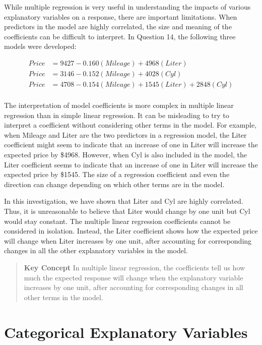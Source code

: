 \documentclass[
]{report}
\begin{document}
While multiple regression is very useful in understanding the impacts of various explanatory variables on a response, there are important limitations. When predictors in the model are highly correlated, the size and meaning of the coefficients can be difficult to interpret. In Question 14, the following three models were developed:

\begin{align}
 Price &= 9427 - 0.160(Mileage) + 4968(Liter)\\
 Price &= 3146 - 0.152(Mileage) + 4028(Cyl)\\
 Price &= 4708 - 0.154(Mileage) + 1545(Liter) + 2848(Cyl)\\
 \end{align}

The interpretation of model coefficients is more complex in multiple linear regression than in simple linear regression. It can be misleading to try to interpret a coefficient without considering other terms in the model. For example, when Mileage and Liter are the two predictors in a regression model, the Liter coefficient might seem to indicate that an increase of one in Liter will increase the expected price by \$4968. However, when Cyl is also included in the model, the Liter coefficient seems to indicate that an increase of one in Liter will increase the expected price by \$1545. The size of a regression coefficient and even the direction can change depending on which other terms are in the model.

In this investigation, we have shown that Liter and Cyl are highly correlated. Thus, it is unreasonable to believe that Liter would change by one unit but Cyl would stay constant. The multiple linear regression coefficients cannot be considered in isolation. Instead, the Liter coefficient shows how the expected price will change when Liter increases by one unit, after accounting for corresponding changes in all the other
explanatory variables in the model.

\begin{quote}
\textbf{Key Concept}
In multiple linear regression, the coefficients tell us how much the expected response will change when the explanatory variable increases by one unit, after accounting for corresponding changes in all other terms in the model.
\end{quote}

\hypertarget{categorical-explanatory-variables}{%
\section{\texorpdfstring{\textbf{Categorical Explanatory Variables}}{Categorical Explanatory Variables}}\label{categorical-explanatory-variables}}
\end{document}
